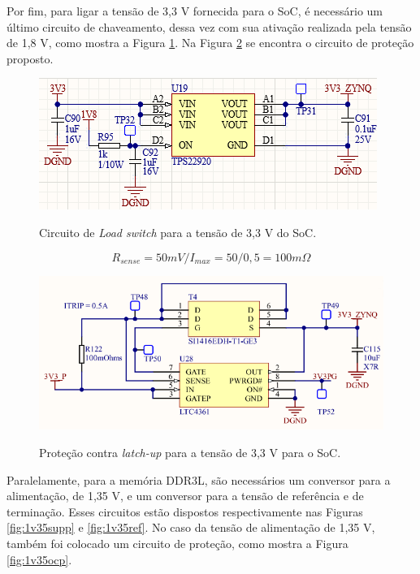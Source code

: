 Por fim, para ligar a tensão de 3,3 V fornecida para o SoC, é necessário um último circuito de chaveamento, dessa vez com sua ativação realizada pela tensão de 1,8 V, como mostra a Figura \ref{fig:sw2}. Na Figura \ref{fig:3v3ocp} se encontra o circuito de proteção proposto.

\begin{figure}[H]
    \centering
    \caption{Circuito de \textit{Load switch} para a tensão de 3,3 V do SoC.}
    \includegraphics[scale=0.8]{images/sw2.png}
    \label{fig:sw2}
\end{figure}

\begin{equation}
	R_{sense} = 50 mV / I_{max} =50 / 0,5 = 100 m\Omega
\end{equation} 

\begin{figure}[H]
    \centering
    \caption{Proteção contra \textit{latch-up} para a tensão de 3,3 V para o SoC.}
    \includegraphics[scale=0.8]{images/3v3ocp.png}
    \label{fig:3v3ocp}
\end{figure}

Paralelamente, para a memória DDR3L, são necessários um conversor para a alimentação, de 1,35 V, e um conversor para a tensão de referência e de terminação. Esses circuitos estão dispostos respectivamente nas Figuras \ref{fig:1v35supp} e \ref{fig:1v35ref}. No caso da tensão de alimentação de 1,35 V, também foi colocado um circuito de proteção, como mostra a Figura \ref{fig:1v35ocp}.

